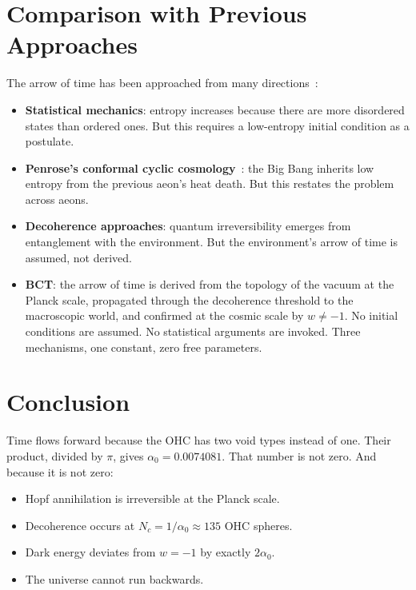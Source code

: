 \documentclass[aps,prl,twocolumn,superscriptaddress,floatfix]{revtex4-2}
\newcommand{\azero}{\alpha_0}
\newcommand{\Nc}{N_c}
\begin{document}
\section{Comparison with Previous Approaches}

The arrow of time has been approached from many 
directions~\cite{Zeh1989,Carroll2010}:

\begin{itemize}
\item \textbf{Statistical mechanics}: entropy increases 
because there are more disordered states than ordered 
ones. But this requires a low-entropy initial condition 
as a postulate.

\item \textbf{Penrose's conformal cyclic cosmology}~\cite{Penrose2010}: 
the Big Bang inherits low entropy from the previous 
aeon's heat death. But this restates the problem across 
aeons.

\item \textbf{Decoherence approaches}: quantum 
irreversibility emerges from entanglement with 
the environment. But the environment's arrow of 
time is assumed, not derived.

\item \textbf{BCT}: the arrow of time is derived 
from the topology of the vacuum at the Planck scale, 
propagated through the decoherence threshold to the 
macroscopic world, and confirmed at the cosmic scale 
by $w \neq -1$. No initial conditions are assumed. 
No statistical arguments are invoked. Three mechanisms, 
one constant, zero free parameters.
\end{itemize}

\section{Conclusion}

Time flows forward because the OHC has two void types 
instead of one. Their product, divided by $\pi$, gives 
$\azero = 0.0074081$. That number is not zero. And 
because it is not zero:

\begin{itemize}
\item Hopf annihilation is irreversible at the Planck scale.
\item Decoherence occurs at $\Nc = 1/\azero \approx 135$ 
OHC spheres.
\item Dark energy deviates from $w = -1$ by exactly $2\azero$.
\item The universe cannot run backwards.
\end{itemize}
\end{document}
